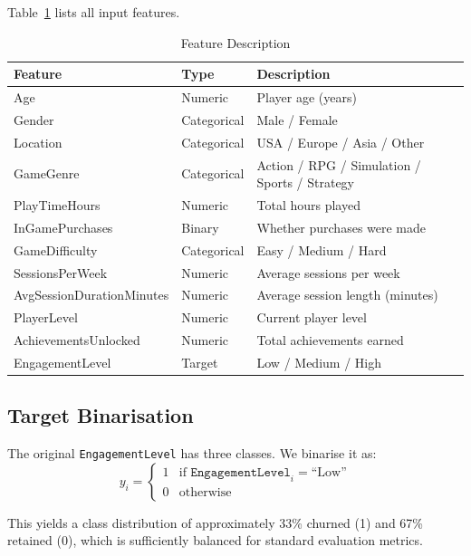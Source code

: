\documentclass[conference]{IEEEtran}
\begin{document}
Table~\ref{tab:features} lists all input features.

\begin{table}[H]
  \caption{Feature Description}
  \label{tab:features}
  \centering
  \begin{tabular}{@{}llp{3.8cm}@{}}
    \toprule
    \textbf{Feature} & \textbf{Type} & \textbf{Description} \\
    \midrule
    Age & Numeric & Player age (years) \\
    Gender & Categorical & Male / Female \\
    Location & Categorical & USA / Europe / Asia / Other \\
    GameGenre & Categorical & Action / RPG / Simulation / Sports / Strategy \\
    PlayTimeHours & Numeric & Total hours played \\
    InGamePurchases & Binary & Whether purchases were made \\
    GameDifficulty & Categorical & Easy / Medium / Hard \\
    SessionsPerWeek & Numeric & Average sessions per week \\
    AvgSessionDurationMinutes & Numeric & Average session length (minutes) \\
    PlayerLevel & Numeric & Current player level \\
    AchievementsUnlocked & Numeric & Total achievements earned \\
    \midrule
    EngagementLevel & Target & Low / Medium / High \\
    \bottomrule
  \end{tabular}
\end{table}

\subsection{Target Binarisation}

The original \texttt{EngagementLevel} has three classes.  We binarise it as:
\begin{equation}
  y_i =
  \begin{cases}
    1 & \text{if } \texttt{EngagementLevel}_i = \text{``Low''} \\
    0 & \text{otherwise}
  \end{cases}
  \label{eq:target}
\end{equation}

This yields a class distribution of approximately 33\% churned (1) and 67\%
retained (0), which is sufficiently balanced for standard evaluation metrics.
\end{document}
